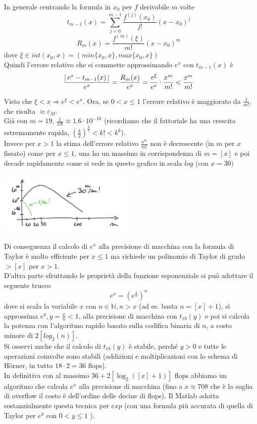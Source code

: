 \documentclass[12pt]{article}
\DeclarePairedDelimiter{\abs}{\lvert}{\rvert}
\begin{document}
\bigskip
In generale centrando la formula in $x_0$ per $f$ derivabile $m$ volte
\[t_{m-1}\left(x\right)=\sum_{j=0}^{m-1}\frac{f^{\left( j\right)}\left(x_0\right)}{j!}\left(x-x_0\right)^j\]
\[R_m\left(x\right)=\frac{f^{\left(m\right)}\left(\xi\right)}{m!}\left(x-x_0\right)^m\]
dove $\xi\in int(x_0,x)=(min\{x_0,x\},max\{x_0,x\})$ \\
Quindi l'errore relativo che si commette approssimando $e^x$ con $t_{m-1}(x)$ è
\[\frac{\abs{\,e^x-t_{m-1}(x)\,}}{e^x}=\frac{R_m(x)}{e^x}=\frac{e^\xi}{e^x}\cdot\frac{x^m}{m!}
<\frac{x^m}{m!}\]

Visto che $\xi<x \Rightarrow e^\xi < e^x$. Ora, se $0<x\le1$ l'errore relativo è maggiorato da $\frac{1}{m!}$, che risulta $\approx \varepsilon_M$.\\
Già con $m=19$, $\frac{1}{19!}\approx 1.6\cdot10^{-16}$ (ricordiamo che il fattoriale ha una crescita estremamente rapida, $\left(\frac{k}{2}\right)^{\frac{k}{2}}<k!<k^k$).\\
Invece per $x>1$ la stima dell'errore relativo $\frac{x^m}{m!}$ non è decrescente (in $m$ per $x$ fissato) come per $x \le 1$, una ha un massimo in corrispondenza di $m =[x]$ e poi decade rapidamente come si vede in questo grafico in scala $log$ (con $x=30)$
\begin{center}
    \includegraphics[width=0.5\textwidth]{grafo1.png}
\end{center}
Di conseguenza il calcolo di $e^x$ alla precisione di macchina con la formula di Taylor è molto efficiente per $x \le 1$ ma richiede un polinomio di Taylor di grado $> [x]$ per $x>1$. \\
D'altra parte sfruttando le proprietà della funzione esponenziale si può adottare il seguente trucco
\[e^x = (e^{\frac{x}{n}})^n\]
dove si scala la variabile $x$ con $n \in \mathbb{N} , n > x$ (ad es. basta $n = [x]+1$), si approssima $e^y, y = \frac{x}{n}<1$, alla precisione di macchina con $t_{18}(y)$ e poi si calcola la potenza con l'algoritmo rapido basato sulla codifica binaria di $n$, a costo minore di $2[log_2(n)]$.\\
Si osservi anche che il calcolo di $t_{18} (y)$ è stabile, perché $y>0$ e tutte le operazioni coinvolte sono stabili (addizioni e moltiplicazioni con lo schema di Hörner, in tutto $18\cdot 2=36$ flops). \\
In definitiva con al massimo $36+2[ \log_2([x]+1)]$ flops abbiamo un algoritmo che calcola $e^x$ alla precisione di macchina (fino a $x \approx 708$ che è la soglia di overflow il costo è dell'ordine delle decine di flops).
Il Matlab adotta sostanzialmente questa tecnica per $exp$ (con una formula più accurata di quella di Taylor per $e^y$ con $0<y\le 1$ ).
\end{document}
